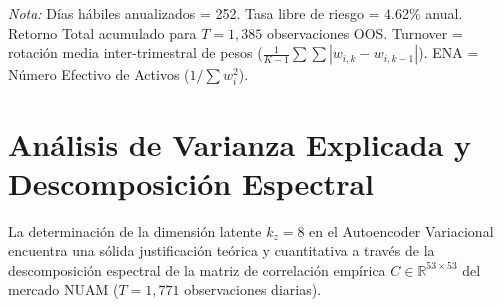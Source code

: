 \documentclass[11pt,a4paper]{article}
\begin{document}
\begin{table}[H]
\centering
\small
\caption{\textbf{Desempeño fuera de muestra (OOS) de los cinco portafolios en el mercado NUAM (2020--2026)}}
\label{tab:tabla5_expandida}
\vspace{0.15cm}
\parbox{\linewidth}{\footnotesize \textit{Nota:} Días hábiles anualizados = 252. Tasa libre de riesgo = 4.62\% anual. Retorno Total acumulado para $T = 1{,}385$ observaciones OOS. Turnover = rotación media inter-trimestral de pesos ($\frac{1}{K-1}\sum \sum |w_{i,k} - w_{i,k-1}|$). ENA = Número Efectivo de Activos ($1/\sum w_i^2$).}
\end{table}

\section{Análisis de Varianza Explicada y Descomposición Espectral}
\label{sec:spectral_analysis}

La determinación de la dimensión latente $k_z = 8$ en el Autoencoder Variacional encuentra una sólida justificación teórica y cuantitativa a través de la descomposición espectral de la matriz de correlación empírica $C \in \mathbb{R}^{53 \times 53}$ del mercado NUAM ($T = 1{,}771$ observaciones diarias).
\end{document}
